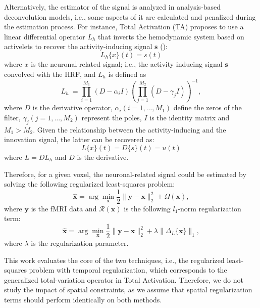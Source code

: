 Alternatively, the estimator of the signal is analyzed in analysis-based deconvolution models, i.e., some aspects of it are calculated and penalized during the estimation process. For instance, Total Activation (TA) proposes to use a linear differential operator \(L_h\) that inverts the hemodynamic system based on activelets to recover the activity-inducing signal \(\mathbf{s}\) (\citealt{karahanoglu2013TotalActivationFMRI,khalidov2011activelets,karahanoglu2011SignalProcessingApproacha}):
\begin{equation}
    L_h\{x\}(t) = s(t)
\end{equation}
where \(x\) is the neuronal-related signal; i.e., the activity inducing signal \(\mathbf{s}\) convolved with the HRF, and \(L_h\) is defined as
\begin{equation}
    L_h\ = \prod_{i=1}^{M_1} (D-\alpha_i I) (\prod_{j=1}^{M_2} (D - \gamma_j I))^{-1},
\end{equation}
where \(D\) is the derivative operator, \(\alpha_i (i=1, \hdots, M_1)\) define the zeros of the filter, \(\gamma_j (j=1, \hdots, M_2)\) represent the poles, \(I\) is the identity matrix and \(M_1 > M_2\). Given the relationship between the activity-inducing and the innovation signal, the latter can be recovered as:
\begin{equation}
    L\{x\}(t) = D\{s\}(t) = u(t)
\end{equation}
where \(L = DL_h\) and \(D\) is the derivative.

Therefore, for a given voxel, the neuronal-related signal could be estimated by solving the following regularized least-squares problem:
\begin{equation}
    \hat{\mathbf{x}} = \arg \min_{\mathbf{x}} \frac{1}{2} \| \mathbf{y} - \mathbf{x} \|_2^2 + \Omega(\mathbf{x}),
\end{equation}
where \(\mathbf{y}\) is the fMRI data and \(\mathcal{R}(\mathbf{x})\) is the following \(l_1\)-norm regularization term:
\begin{equation}
    \hat{\mathbf{x}} = \arg \min_{\mathbf{x}} \frac{1}{2} \| \mathbf{y} - \mathbf{x} \|_2^2 + \lambda \| \Delta_L \{\mathbf{x}\} \|_1,
\end{equation}
where \(\lambda\) is the regularization parameter.

This work evaluates the core of the two techniques, i.e., the regularized least-squares problem with temporal regularization, which corresponds to the generalized total-variation operator in Total Activation. Therefore, we do not study the impact of spatial constraints, as we assume that spatial regularization terms should perform identically on both methods.

